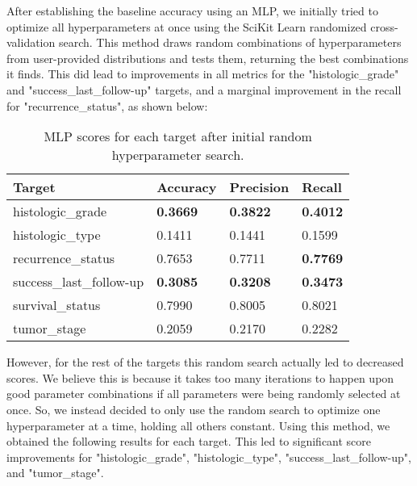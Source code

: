 \documentclass{article}
\begin{document}
After establishing the baseline accuracy using an MLP, we initially tried to optimize all hyperparameters at once using the SciKit Learn randomized cross-validation search. This method draws random combinations of hyperparameters from user-provided distributions and tests them, returning the best combinations it finds. This did lead to improvements in all metrics for the "histologic\_grade" and "success\_last\_follow-up" targets, and a marginal improvement in the recall for "recurrence\_status", as shown below:

\medskip

\begin{table}[H]
\begin{center}
\begin{tabular}{ *{4}{l} }
    \multicolumn{1}{p{1.5cm}}{\raggedright Target} &  
    \multicolumn{1}{p{1.5cm}}{\raggedright Accuracy} &  
    \multicolumn{1}{p{1.5cm}}{\raggedright Precision} &  
    \multicolumn{1}{p{1.5cm}}{\raggedright Recall} \\ \hline
histologic\_grade       &              \textbf{0.3669} &               \textbf{0.3822} &            \textbf{0.4012} \\
histologic\_type        &              0.1411 &               0.1441 &            0.1599 \\
recurrence\_status      &              0.7653 &               0.7711 &            \textbf{0.7769} \\
success\_last\_follow-up &              \textbf{0.3085} &               \textbf{0.3208} &            \textbf{0.3473} \\
survival\_status        &              0.7990 &               0.8005 &            0.8021 \\
tumor\_stage            &              0.2059 &               0.2170 &            0.2282 \\
\end{tabular}
\caption{MLP scores for each target after initial random hyperparameter search.}
\end{center}
\end{table}

However, for the rest of the targets this random search actually led to decreased scores. We believe this is because it takes too many iterations to happen upon good parameter combinations if all parameters were being randomly selected at once. So, we instead decided to only use the random search to optimize one hyperparameter at a time, holding all others constant. Using this method, we obtained the following results for each target. This led to significant score improvements for "histologic\_grade", "histologic\_type", "success\_last\_follow-up", and "tumor\_stage".
\end{document}
